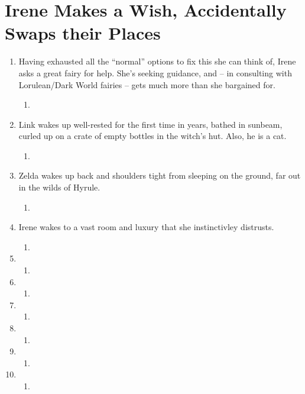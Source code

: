 \documentclass[../FGP.tex]{subfiles}
\begin{document}
\section{Irene Makes a Wish, Accidentally Swaps their Places}
\begin{enumerate}
\item Having exhausted all the ``normal'' options to fix this she can think of, Irene asks a great fairy for help. She's seeking guidance, and -- in consulting with Lorulean/Dark World fairies -- gets much more than she bargained for.\begin{enumerate} \item \end{enumerate}
\item Link wakes up well-rested for the first time in years, bathed in sunbeam, curled up on a crate of empty bottles in the witch's hut. Also, he is a cat.\begin{enumerate} \item \end{enumerate}
\item Zelda wakes up back and shoulders tight from sleeping on the ground, far out in the wilds of Hyrule.\begin{enumerate} \item \end{enumerate}
\item Irene wakes to a vast room and luxury that she instinctivley distrusts. \begin{enumerate} \item \end{enumerate}  
   \item \begin{enumerate} \item \end{enumerate}
   \item \begin{enumerate} \item \end{enumerate}
   \item \begin{enumerate} \item \end{enumerate}
   \item \begin{enumerate} \item \end{enumerate} 
   \item \begin{enumerate} \item \end{enumerate} 
   \item \begin{enumerate} \item \end{enumerate}
\end{enumerate}
\end{document}
